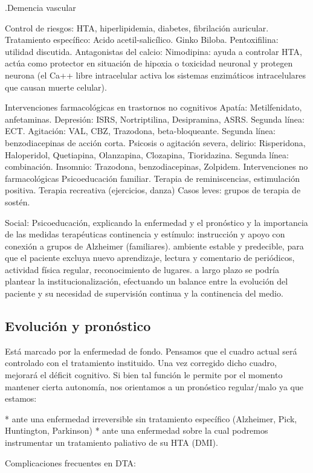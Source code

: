 .Demencia vascular

Control de riesgos: HTA, hiperlipidemia, diabetes, fibrilación auricular. Tratamiento específico: Acido acetil-salicílico. Ginko Biloba. Pentoxifilina: utilidad discutida. Antagonistas del calcio: Nimodipina: ayuda a controlar HTA, actúa como protector en situación de hipoxia o toxicidad neuronal y protegen neurona (el Ca++ libre intracelular activa los sistemas enzimáticos intracelulares que causan muerte celular).

Intervenciones farmacológicas en trastornos no cognitivos Apatía: Metilfenidato, anfetaminas. Depresión: ISRS, Nortriptilina, Desipramina, ASRS. Segunda línea: ECT. Agitación: VAL, CBZ, Trazodona, beta-bloqueante. Segunda línea: benzodiacepinas de acción corta. Psicosis o agitación severa, delirio: Risperidona, Haloperidol, Quetiapina, Olanzapina, Clozapina, Tioridazina. Segunda línea: combinación. Insomnio: Trazodona, benzodiacepinas, Zolpidem. Intervenciones no farmacológicas Psicoeducación familiar. Terapia de reminiscencias, estimulación positiva. Terapia recreativa (ejercicios, danza) Casos leves: grupos de terapia de sostén.

Social: Psicoeducación, explicando la enfermedad y el pronóstico y la importancia de las medidas terapéuticas continencia y estímulo: instrucción y apoyo con conexión a grupos de Alzheimer (familiares). ambiente estable y predecible, para que el paciente excluya nuevo aprendizaje, lectura y comentario de periódicos, actividad física regular, reconocimiento de lugares. a largo plazo se podría plantear la institucionalización, efectuando un balance entre la evolución del paciente y su necesidad de supervisión continua y la continencia del medio.

\subsection*{Evolución y pronóstico}
Está marcado por la enfermedad de fondo. Pensamos que el cuadro actual será controlado con el tratamiento instituido. Una vez corregido dicho cuadro, mejorará el déficit cognitivo. Si bien tal función le permite por el momento mantener cierta autonomía, nos orientamos a un pronóstico regular/malo ya que estamos:

* ante una enfermedad irreversible sin tratamiento específico (Alzheimer, Pick, Huntington, Parkinson)
* ante una enfermedad sobre la cual podremos instrumentar un tratamiento paliativo de su HTA (DMI).

Complicaciones frecuentes en DTA:

